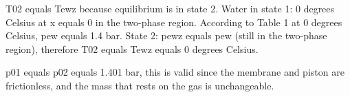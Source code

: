 T02 equals Tewz because equilibrium is in state 2.
Water in state 1: 0 degrees Celsius at x equals 0 in the two-phase region.
According to Table 1 at 0 degrees Celsius, pew equals 1.4 bar.
State 2: pewz equals pew (still in the two-phase region), therefore
T02 equals Tewz equals 0 degrees Celsius.

p01 equals p02 equals 1.401 bar, this is valid since the membrane and piston are frictionless,
and the mass that rests on the gas is unchangeable.